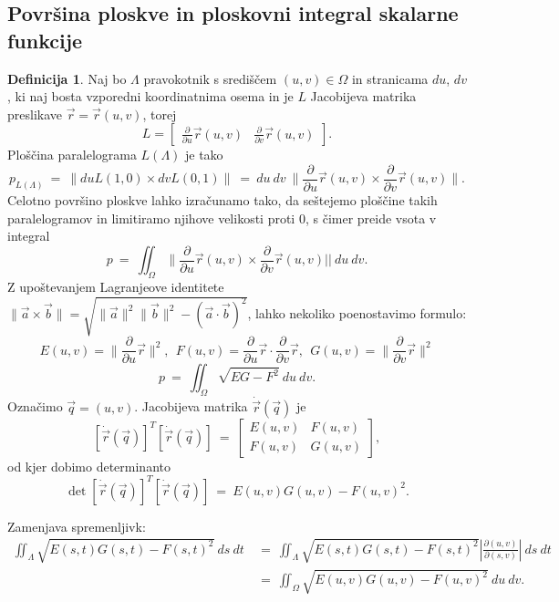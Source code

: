 \documentclass[11pt]{article}
\theoremstyle{definition}
\newtheorem{definicija}{Definicija}[section]
\theoremstyle{definition}
\theoremstyle{definition}
\begin{document}

\subsection{Površina ploskve in ploskovni integral skalarne funkcije}
\vspace{0.5cm}

\begin{definicija}

Naj bo $\Lambda$ pravokotnik s središčem $(u, v) \in \Omega$ in stranicama $du$, $dv$, ki naj bosta vzporedni koordinatnima osema in je $L$ Jacobijeva matrika preslikave $\vec{r} = \vec{r}(u, v)$, torej
$$L = \begin{bmatrix}
\frac{\partial}{\partial u}\vec{r}(u, v) & \frac{\partial}{\partial v}\vec{r}(u, v)
\end{bmatrix}.$$
Ploščina paralelograma $L(\Lambda)$ je tako 
$$p_{L(\Lambda)} ~=~ \|du L(1,0) \times dv L(0, 1)\| ~=~ du~dv~\|\frac{\partial}{\partial u}\vec{r}(u, v) \times \frac{\partial}{\partial v}\vec{r}(u, v)\|.$$
Celotno površino ploskve lahko izračunamo tako, da seštejemo ploščine takih paralelogramov in limitiramo njihove velikosti proti $0$, s čimer preide vsota v integral
$$p ~=~ \iint_{\Omega} \|\frac{\partial}{\partial u}\vec{r}(u, v) \times \frac{\partial}{\partial v}\vec{r}(u, v)||~du~dv.$$
Z upoštevanjem Lagranjeove identitete $\|\vec{a} \times \vec{b}\| = \sqrt{\|\vec{a}\|^2 \|\vec{b}\|^2 - (\vec{a} \cdot \vec{b})^2}$, lahko nekoliko poenostavimo formulo:
$$E(u, v) = \|\frac{\partial}{\partial u}\vec{r}\|^2, ~~F(u, v) = \frac{\partial}{\partial u}\vec{r} \cdot \frac{\partial}{\partial v}\vec{r}, ~~G(u, v) = \|\frac{\partial}{\partial v}\vec{r}\|^2$$
$$p ~=~ \iint_{\Omega} \sqrt{EG - F^2}~du~dv.$$
Označimo $\vec{q} = (u, v)$. Jacobijeva matrika $\dot{\vec{r}}(\vec{q})$ je 
$$[\dot{\vec{r}}(\vec{q})]^T[\dot{\vec{r}}(\vec{q})] ~=~ \begin{bmatrix}
E(u, v) & F(u, v) \\
F(u, v) & G(u, v)
\end{bmatrix},$$
od kjer dobimo determinanto
$$\det{[\dot{\vec{r}}(\vec{q})]^T[\dot{\vec{r}}(\vec{q})]} ~=~ E(u, v)G(u, v) - F(u, v)^2.$$ 
\vspace{0.5cm}

\noindent Zamenjava spremenljivk:
\begin{align*}
\iint_{\Lambda} \sqrt{E(s, t)G(s, t) - F(s, t)^2}~ds~dt ~&=~ \iint_{\Lambda} \sqrt{E(s, t)G(s, t) - F(s, t)^2}\left|\frac{\partial(u, v)}{\partial(s, v)}\right|~ds~dt \\
&=~ \iint_{\Omega} \sqrt{E(u, v)G(u, v) - F(u, v)^2}~du~dv.
\end{align*}

\end{definicija}
\vspace{0.5cm}
\end{document}
